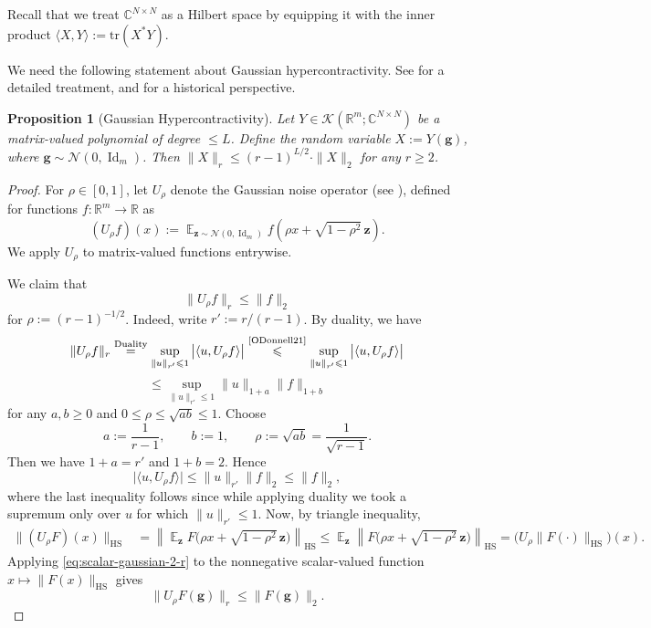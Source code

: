\documentclass
[11pt,letterpaper]
{article}
\newtheorem{proposition}[theorem]{Proposition}
\theoremstyle{definition}
\newcommand{\cN}{\mathcal{N}}
\newcommand{\R}{{\mathbb R}}
\newcommand{\1}{\mathbf{1}}
\newcommand{\tr}{\mathrm{tr}}
\newcommand{\C}{\mathbb C}
\newcommand{\Id}{\operatorname{Id}}
\DeclareMathOperator*{\E}{\mathbb{E}}
\newcommand{\cK}{\mathcal K}
\renewcommand{\geq}{\geqslant}
\renewcommand{\leq}{\leqslant}
\begin{document}
Recall that we treat $\C^{N\times N}$ as a Hilbert space by equipping it with the inner product $\langle X, Y\rangle:= \tr(X^*Y)$. 

We need the following statement about Gaussian hypercontractivity. See \cite{Janson97,ODonnell21} for a detailed treatment, and \cite{Nelson66,Nelson73,Gross75} for a historical perspective.
\begin{proposition}[Gaussian Hypercontractivity]\label{fact:gaussian-hypercontractivity}
    Let $Y\in\cK(\R^m;\C^{N\times N})$ be a matrix-valued polynomial of degree $\leq L$. Define the random variable $X:= Y(\bm g)$, where $\bm g\sim\cN(0, \Id_m)$. Then $\|X\|_r\leq (r - 1)^{L/2}\cdot\|X\|_2$ for any $r\geq 2$.
\end{proposition}
\begin{proof}
For $\rho\in[0,1]$, let $U_\rho$ denote the Gaussian noise operator (see \cite[Definition~11.12]{ODonnell21}), defined for functions $f:\R^m\to\R$ as
\[(U_\rho f)(x):=\E_{\bm z\sim\cN(0,\Id_m)}f\left(\rho x+\sqrt{1-\rho^2}\,\bm z\right).\]
We apply $U_\rho$ to
matrix-valued functions entrywise.

We claim that 
\begin{equation}\label{eq:scalar-gaussian-2-r}
    \|U_\rho f\|_r\leq \|f\|_2
\end{equation}
for $\rho:= (r-1)^{-1/2}$. Indeed, write $r':=r/(r-1)$. By duality, we have
\[\|U_\rho f\|_r \overset{\text{Duality}}{=} \sup_{\|u\|_{r'}\leq 1} \big|\langle u,U_\rho f\rangle\big|\overset{\text{\cite[Section~11.1, Gaussian Hypercontractivity Theorem]{ODonnell21}}}{\leq} \sup_{\|u\|_{r'}\leq 1}\big|\langle u,U_\rho f\rangle\big|\] 
\[\leq\sup_{\|u\|_{r'}\leq 1}\|u\|_{1+a}\|f\|_{1+b}\]
for any $a,b\geq 0$ and $0\leq\rho\leq\sqrt{ab}\leq 1$. Choose 
\[
    a:=\frac{1}{r-1},
    \qquad
    b:=1,
    \qquad
    \rho:=\sqrt{ab}=\frac{1}{\sqrt{r-1}}.
\]
Then we have $1+a=r'$ and $1+b=2$. Hence
\[
    \big|\langle u,U_\rho f\rangle\big|
    \leq
    \|u\|_{r'}\|f\|_2\leq\|f\|_2,
\]
where the last inequality follows since while applying duality we took a supremum only over $u$ for which $\|u\|_{r'}\leq 1$. Now, by triangle inequality,
\begin{align*}
    \|(U_\rho F)(x)\|_{\mathrm{HS}}
    &=
    \left\|
        \E_{\bm z}
        F\bigl(\rho x+\sqrt{1-\rho^2}\,\bm z\bigr)
    \right\|_{\mathrm{HS}} \leq
    \E_{\bm z}
    \left\|
        F\bigl(\rho x+\sqrt{1-\rho^2}\,\bm z\bigr)
    \right\|_{\mathrm{HS}}=
    \bigl(U_\rho\|F(\cdot)\|_{\mathrm{HS}}\bigr)(x).
\end{align*}
Applying \eqref{eq:scalar-gaussian-2-r} to the nonnegative scalar-valued
function $x\mapsto\|F(x)\|_{\mathrm{HS}}$ gives
\begin{equation}\label{eq:matrix-gaussian-2-r}
    \|U_\rho F(\bm g)\|_r
    \leq
    \|F(\bm g)\|_2.
\end{equation}


\end{proof}
\end{document}
